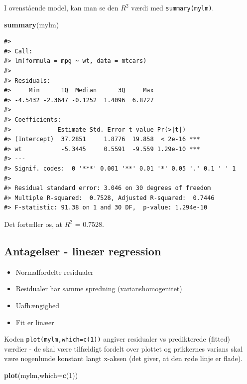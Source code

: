 \documentclass[
]{book}
\newenvironment{Shaded}{\begin{snugshade}}{\end{snugshade}}
\newcommand{\AttributeTok}[1]{\textcolor[rgb]{0.27,0.27,0.27}{#1}}
\newcommand{\DecValTok}[1]{\textcolor[rgb]{0.06,0.06,0.06}{#1}}
\newcommand{\FunctionTok}[1]{\textcolor[rgb]{0.27,0.27,0.27}{\textbf{#1}}}
\newcommand{\NormalTok}[1]{#1}
\providecommand{\tightlist}{%
  \setlength{\itemsep}{0pt}\setlength{\parskip}{0pt}}
\begin{document}
I ovenstående model, kan man se den \(R^2\) værdi med \texttt{summary(mylm)}.

\begin{Shaded}
\begin{Highlighting}[]
\FunctionTok{summary}\NormalTok{(mylm)}
\end{Highlighting}
\end{Shaded}

\begin{verbatim}
#> 
#> Call:
#> lm(formula = mpg ~ wt, data = mtcars)
#> 
#> Residuals:
#>     Min      1Q  Median      3Q     Max 
#> -4.5432 -2.3647 -0.1252  1.4096  6.8727 
#> 
#> Coefficients:
#>             Estimate Std. Error t value Pr(>|t|)    
#> (Intercept)  37.2851     1.8776  19.858  < 2e-16 ***
#> wt           -5.3445     0.5591  -9.559 1.29e-10 ***
#> ---
#> Signif. codes:  0 '***' 0.001 '**' 0.01 '*' 0.05 '.' 0.1 ' ' 1
#> 
#> Residual standard error: 3.046 on 30 degrees of freedom
#> Multiple R-squared:  0.7528, Adjusted R-squared:  0.7446 
#> F-statistic: 91.38 on 1 and 30 DF,  p-value: 1.294e-10
\end{verbatim}

Det fortæller os, at \(R^2\) = 0.7528.

\subsection{Antagelser - lineær regression}\label{antagelser---lineuxe6r-regression}

\begin{itemize}
\tightlist
\item
  Normalfordelte residualer
\item
  Residualer har samme spredning (varianshomogenitet)
\item
  Uafhængighed
\item
  Fit er linæer
\end{itemize}

Koden \texttt{plot(mylm,which=c(1))} angiver residualer vs predikterede (fitted) værdier - de skal være tilfældigt fordelt over plottet og prikkernes varians skal være nogenlunde konstant langt x-aksen (det giver, at den røde linje er flade).

\begin{Shaded}
\begin{Highlighting}[]
\FunctionTok{plot}\NormalTok{(mylm,}\AttributeTok{which=}\FunctionTok{c}\NormalTok{(}\DecValTok{1}\NormalTok{))}
\end{Highlighting}
\end{Shaded}
\end{document}

